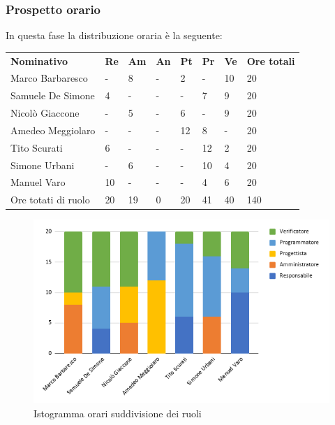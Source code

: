     \subsubsection{Prospetto orario}
    In questa fase la distribuzione oraria è la seguente:
        \begin{center}
            \begin{table}[ht!]
                \centering
                \renewcommand{\arraystretch}{1.8}
                \begin{tabular}{p{100px} p{20px} p{20px} p{20px} p{20px} p{20px} p{20px} p{50px} }
                    \rowcolor{logo!70} \textbf{Nominativo} & \textbf{Re} & \textbf{Am} & \textbf{An} & \textbf{Pt} & \textbf{Pr} & \textbf{Ve} & \textbf{Ore totali}\\
                    Marco Barbaresco & - & 8 & - & 2 & - & 10 & 20\\
                    Samuele De Simone & 4 & - & - & - & 7 & 9 & 20\\
                    Nicolò Giaccone & - & 5 & - & 6 & - & 9 & 20\\
                    Amedeo Meggiolaro & - & - & - & 12 & 8 & - & 20\\
                    Tito Scurati & 6 & - & - & - & 12 & 2 & 20\\
                    Simone Urbani & - & 6 & - & - & 10 & 4 & 20\\
                    Manuel Varo & 10 & - & - & - & 4 & 6 & 20\\
                    Ore totati di ruolo & 20 & 19 & 0 & 20 & 41 & 40 & 140\\
                \end{tabular}
            \end{table}
        \end{center}
        \pagebreak

        \begin{figure}[!h]
            \caption{Istogramma orari suddivisione dei ruoli}
            \vspace{5px}
            \includegraphics[scale=0.6]{../../../Images/Diagrammi/Istogrammi/ore validificazione.png}
            \centering
        \end{figure}

